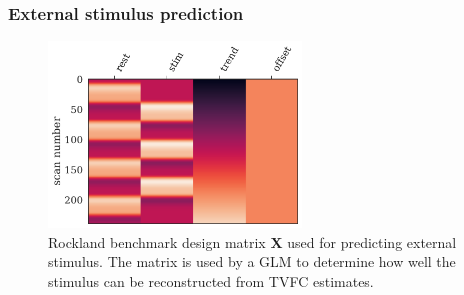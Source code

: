 \subsubsection{External stimulus prediction}


\begin{figure}[t]
  \centering
  \includegraphics[width=0.6\textwidth]{fig/rockland/CHECKERBOARD645/prediction_benchmark/design_matrix_nilearn}
  \caption{
    Rockland benchmark design matrix $\mathbf{X}$ used for predicting external stimulus.
    The matrix is used by a GLM to determine how well the stimulus can be reconstructed from TVFC estimates.
  }\label{fig:rockland-design-matrix}
\end{figure}


